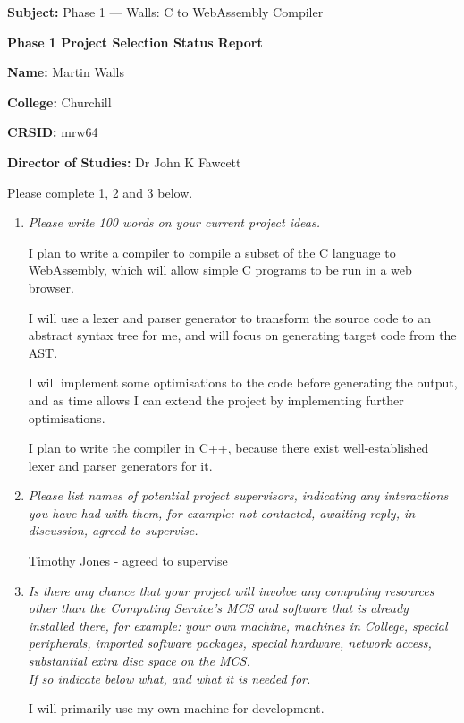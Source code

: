 

\setlength{\parindent}{0em}



\textbf{Subject:} Phase 1 --- Walls: C to WebAssembly Compiler

\textbf{Phase 1 Project Selection Status Report}

\textbf{Name:} Martin Walls

\textbf{College:} Churchill

\textbf{CRSID:} mrw64

\textbf{Director of Studies:} Dr John K Fawcett

Please complete 1, 2 and 3 below.

\begin{enumerate}
\item %

\textit{Please write 100 words on your current project ideas.}

I plan to write a compiler to compile a subset of the C language to WebAssembly, which will allow simple C programs to be run in a web browser.

I will use a lexer and parser generator to transform the source code to an abstract syntax tree for me, and will focus on generating target code from the AST.

I will implement some optimisations to the code before generating the output, and as time allows I can extend the project by implementing further optimisations.

I plan to write the compiler in C++, because there exist well-established lexer and parser generators for it.

\item %
\textit{Please list names of potential project supervisors, indicating
any interactions you have had with them, for example: not
contacted, awaiting reply, in discussion, agreed to supervise.}

Timothy Jones - agreed to supervise

\item %
\textit{Is there any chance that your project will involve any
computing resources other than the Computing Service's MCS and
software that is already installed there, for example: your own
machine, machines in College, special peripherals, imported
software packages, special hardware, network access, substantial
extra disc space on the MCS.
\\
If so indicate below what, and what it is needed for.}

I will primarily use my own machine for development.
\end{enumerate}







